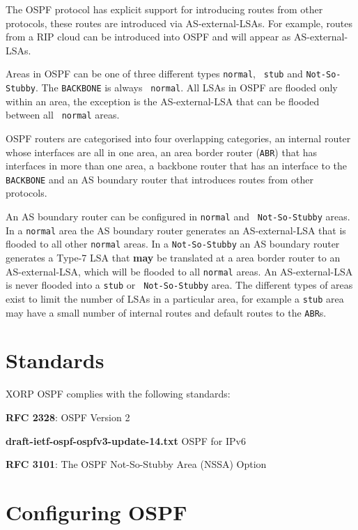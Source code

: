 The OSPF protocol has explicit support for introducing routes from
other protocols, these routes are introduced via AS-external-LSAs. For
example, routes from a RIP cloud can be introduced into OSPF and will
appear as AS-external-LSAs.

Areas in OSPF can be one of three different types {\tt normal}, {\tt
stub} and {\tt Not-So-Stubby}. The {\tt BACKBONE} is always {\tt
normal}. All LSAs in OSPF are flooded only within an area, the
exception is the AS-external-LSA that can be flooded between all {\tt
normal} areas.

OSPF routers are categorised into four overlapping categories, an
internal router whose interfaces are all in one area, an area border
router ({\tt ABR}) that has interfaces in more than one area, a backbone router
that has an interface to the {\tt BACKBONE} and an AS boundary router
that introduces routes from other protocols.

An AS boundary router can be configured in {\tt normal} and {\tt
Not-So-Stubby} areas. In a {\tt normal} area the AS boundary router
generates an AS-external-LSA that is flooded to all other {\tt normal}
areas. In a {\tt Not-So-Stubby} an AS boundary router generates a
Type-7 LSA that {\bf may} be translated at a area border router to an
AS-external-LSA, which will be flooded to all {\tt normal} areas. An
AS-external-LSA is never flooded into a {\tt stub} or {\tt
Not-So-Stubby} area. The different types of areas exist to limit the
number of LSAs in a particular area, for example a {\tt stub} area may
have a small number of internal routes and default routes to the
{\tt ABR}s.

\section{Standards}

XORP OSPF complies with the following standards:
\begin{description}
\item{\bf RFC 2328}: OSPF Version 2
\item{\bf draft-ietf-ospf-ospfv3-update-14.txt} OSPF for IPv6
\item{\bf RFC 3101}: The OSPF Not-So-Stubby Area (NSSA) Option
\end{description}

\newpage
\section{Configuring OSPF}

